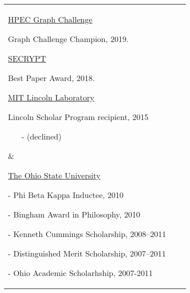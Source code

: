 \documentclass[10pt]{article}
\newcommand{\halfblankline}{\quad\vspace{-0.5\baselineskip}\pagebreak[3]}
\begin{document}
\begin{tabular}[t]{@{}p{\textwidth-\rcollength-3.5\spacewidth}@{}p{\spacewidth}@{}p{\rcollength}}%

\parbox{\textwidth-\rcollength-\spacewidth}{%
\href{https://graphchallenge.mit.edu/champions}{HPEC Graph Challenge}
\begin{innerlist}
\item[] Graph Challenge Champion, 2019.
\end{innerlist}

\halfblankline

\href{http://www.secrypt.icete.org/PreviousAwards.aspx}{SECRYPT}
\begin{innerlist}
\item[] Best Paper Award, 2018.
\end{innerlist}

\halfblankline

\href{http://www.ll.mit.edu}{MIT Lincoln Laboratory}
\begin{innerlist}
\item[] Lincoln Scholar Program recipient, 2015
\vspace{-0.5em}
\begin{itemize}
	\item[-] (declined)
\end{itemize}
\end{innerlist}
}

&

\parbox{1.5\rcollength}{%
\href{http://www.osu.edu}{The Ohio State University}
\begin{innerlist}
\item[-] Phi Beta Kappa Inductee, 2010
\item[-] Bingham Award in Philosophy, 2010
\item[-] Kenneth Cummings Scholarship, 2008--2011
\item[-] Distinguished Merit Scholarship, 2007--2011
\item[-] Ohio Academic Scholarhship, 2007-2011
\end{innerlist}
}

\end{tabular}
\end{document}
